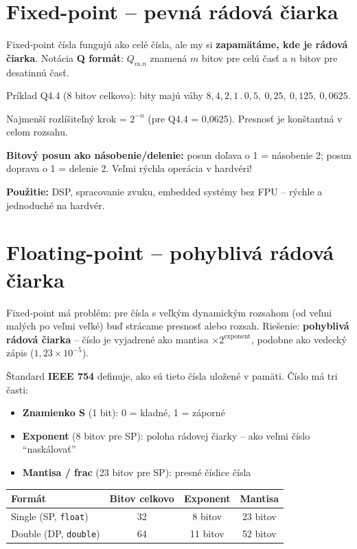 \section{Fixed-point -- pevná rádová čiarka}

Fixed-point čísla fungujú ako celé čísla, ale my si \textbf{zapamätáme, kde je rádová čiarka}. Notácia \textbf{Q formát}: $Q_{m.n}$ znamená $m$ bitov pre celú časť a $n$ bitov pre desatinnú časť.

Príklad Q4.4 (8 bitov celkovo): bity majú váhy $8, 4, 2, 1 \,.\, 0{,}5,\ 0{,}25,\ 0{,}125,\ 0{,}0625$.

Najmenší rozlíšiteľný krok = $2^{-n}$ (pre Q4.4 = 0,0625). Presnosť je konštantná v celom rozsahu.

\textbf{Bitový posun ako násobenie/delenie:} posun doľava o 1 = násobenie 2; posun doprava o 1 = delenie 2. Veľmi rýchla operácia v hardvéri!

\textbf{Použitie:} DSP, spracovanie zvuku, embedded systémy bez FPU -- rýchle a jednoduché na hardvér.

\section{Floating-point -- pohyblivá rádová čiarka}

Fixed-point má problém: pre čísla s veľkým dynamickým rozsahom (od veľmi malých po veľmi veľké) buď strácame presnosť alebo rozsah. Riešenie: \textbf{pohyblivá rádová čiarka} -- číslo je vyjadrené ako mantisa $\times 2^{\text{exponent}}$, podobne ako vedecký zápis ($1{,}23 \times 10^{-5}$).

Štandard \textbf{IEEE 754} definuje, ako sú tieto čísla uložené v pamäti. Číslo má tri časti:
\begin{itemize}
    \item \textbf{Znamienko S} (1 bit): 0 = kladné, 1 = záporné
    \item \textbf{Exponent} (8 bitov pre SP): poloha rádovej čiarky -- ako veľmi číslo ``naskálovať''
    \item \textbf{Mantisa / frac} (23 bitov pre SP): presné číslice čísla
\end{itemize}

\begin{center}
\begin{tabular}{lccc}
\toprule
\textbf{Formát} & \textbf{Bitov celkovo} & \textbf{Exponent} & \textbf{Mantisa} \\
\midrule
Single (SP, \texttt{float}) & 32 & 8 bitov & 23 bitov \\
Double (DP, \texttt{double}) & 64 & 11 bitov & 52 bitov \\
\bottomrule
\end{tabular}
\end{center}

